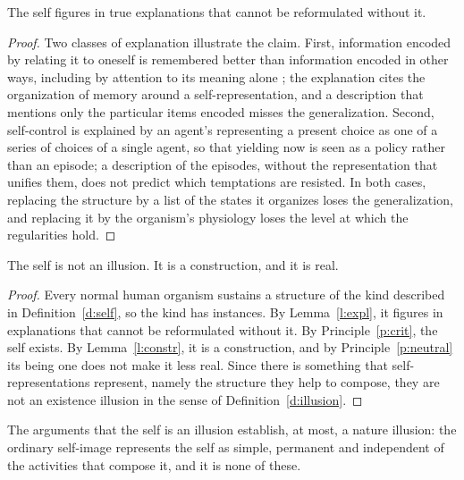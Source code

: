 \documentclass{situationist-preprint}
\begin{document}
\begin{lemma}\label{l:expl}
The self figures in true explanations that cannot be reformulated without it.
\end{lemma}

\begin{proof}
Two classes of explanation illustrate the claim. First, information encoded by relating it to oneself is remembered better than information encoded in other ways, including by attention to its meaning alone \citep{RogersKuiperKirker1977}; the explanation cites the organization of memory around a self-representation, and a description that mentions only the particular items encoded misses the generalization. Second, self-control is explained by an agent's representing a present choice as one of a series of choices of a single agent, so that yielding now is seen as a policy rather than an episode; a description of the episodes, without the representation that unifies them, does not predict which temptations are resisted. In both cases, replacing the structure by a list of the states it organizes loses the generalization, and replacing it by the organism's physiology loses the level at which the regularities hold.
\end{proof}

\begin{theorem}\label{t:main}
The self is not an illusion. It is a construction, and it is real.
\end{theorem}

\begin{proof}
Every normal human organism sustains a structure of the kind described in Definition~\ref{d:self}, so the kind has instances. By Lemma~\ref{l:expl}, it figures in explanations that cannot be reformulated without it. By Principle~\ref{p:crit}, the self exists. By Lemma~\ref{l:constr}, it is a construction, and by Principle~\ref{p:neutral} its being one does not make it less real. Since there is something that self-representations represent, namely the structure they help to compose, they are not an existence illusion in the sense of Definition~\ref{d:illusion}.
\end{proof}

\begin{corollary}\label{c:nature}
The arguments that the self is an illusion establish, at most, a nature illusion: the ordinary self-image represents the self as simple, permanent and independent of the activities that compose it, and it is none of these.
\end{corollary}
\end{document}
